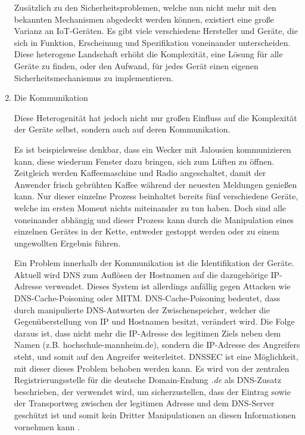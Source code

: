 \begin{enumerate}
            Zusätzlich zu den Sicherheitsproblemen, welche nun nicht mehr mit den bekannten Mechanismen abgedeckt werden können, existiert eine große Varianz an \ac{IoT}-Geräten. Es gibt viele verschiedene Hersteller und Geräte, die sich in Funktion, Erscheinung und Spezifikation voneinander unterscheiden. Diese heterogene Landschaft erhöht die Komplexität, eine Lösung für alle Geräte zu finden, oder den Aufwand, für jedes Gerät einen eigenen Sicherheitsmechanismus zu implementieren.
            
            \item Die Kommunikation
            
            Diese Heterogenität hat jedoch nicht nur großen Einfluss auf die Komplexität der Geräte selbst, sondern auch auf deren Kommunikation.
        
            Es ist beispielsweise denkbar, dass ein Wecker mit Jalousien kommunizieren kann, diese wiederum Fenster dazu bringen, sich zum Lüften zu öffnen. Zeitgleich werden Kaffeemaschine und Radio angeschaltet, damit der Anwender frisch gebrühten Kaffee während der neuesten Meldungen genießen kann.
            Nur dieser einzelne Prozess beinhaltet bereits fünf verschiedene Geräte, welche im ersten Moment nichts miteinander zu tun haben. Doch sind alle voneinander abhängig und dieser Prozess kann durch die Manipulation eines einzelnen Gerätes in der Kette, entweder gestoppt werden oder zu einem ungewollten Ergebnis führen.
            
            Ein Problem innerhalb der Kommunikation ist die Identifikation der Geräte. Aktuell wird \ac{DNS} zum Auflösen der Hostnamen auf die dazugehörige IP-Adresse verwendet. Dieses System ist allerdings anfällig gegen Attacken wie DNS-Cache-Poisoning oder \ac{MITM}.
            DNS-Cache-Poisoning bedeutet, dass durch manipulierte DNS-Antworten der Zwischenspeicher, welcher die Gegenüberstellung von IP und Hostnamen besitzt, verändert wird. Die Folge daraus ist, dass nicht mehr die IP-Adresse des legitimen Ziels neben dem Namen (z.B. hochschule-mannheim.de), sondern die IP-Adresse des Angreifers steht, und somit auf den Angreifer weiterleitet.
            \ac{DNSSEC} ist eine Möglichkeit, mit dieser dieses Problem behoben werden kann. Es wird von der zentralen Registrierungsstelle für die deutsche Domain-Endung \emph{.de} als \ac{DNS}-Zusatz beschrieben, der verwendet wird, um sicherzustellen, dass der Eintrag sowie der Transportweg zwischen der legitimen Adresse und dem DNS-Server geschützt ist und somit kein Dritter Manipulationen an diesen Informationen vornehmen kann \cite{denic_eg}.
    \end{enumerate}
    
